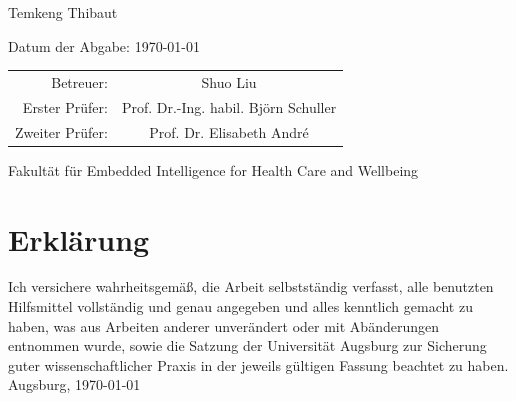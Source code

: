 \documentclass[12pt,a4paper]{scrartcl}
\numberwithin{equation}{section}
\begin{document}
\begin{titlepage}
\begin{center}
	Temkeng Thibaut
    \vspace*{1.5cm}

    Datum der Abgabe: \today
    \vspace*{2.5cm}


    \begin{table}[h!]
    	\centering
    	\begin{tabular}{rc}
    		Betreuer: & Shuo Liu \\
    		Erster Prüfer:	& Prof. Dr.-Ing. habil. Björn Schuller\\
    		Zweiter Prüfer:&Prof. Dr. Elisabeth André\\
    		
    		
    	\end{tabular}
    \end{table}
    Fakultät für Embedded Intelligence for Health Care and Wellbeing \\[1cm]

  \end{center}
\end{titlepage}




    \section*{Erklärung}
  
  Ich  versichere  wahrheitsgemäß,  die  Arbeit selbstständig verfasst,  alle  benutzten  Hilfsmittel  vollständig  und  genau  angegeben  und  alles kenntlich  gemacht  zu  haben,  was  aus  Arbeiten  anderer  unverändert  oder  mit  Abänderungen entnommen  wurde,  sowie die Satzung  der  Universität Augsburg  zur  Sicherung guter wissenschaftlicher Praxis in der jeweils gültigen Fassung beachtet zu haben.
  \\[2ex] 
  
  \noindent
  Augsburg, \today\\[5ex]
 
\end{document}
